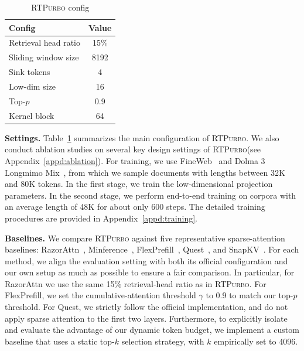 \documentclass{llmxive}
\providecommand{\name}{{\textsc{RTPurbo}}\xspace}
\providecommand{\arraystretch}{0.94}
\begin{document}
\begin{table}[t]

    \vspace{-1.0em}
    \centering
    \scriptsize
    \setlength{\tabcolsep}{3pt}
    \renewcommand{\arraystretch}{0.95}
    \captionsetup{width=\linewidth, justification=centering, singlelinecheck=true, skip=2pt}
    \begin{tabular*}{\linewidth}{@{\extracolsep{\fill}}lc@{}}
        \toprule
        \textbf{Config} & \textbf{Value} \\
        \midrule
        Retrieval head ratio & 15\% \\
        Sliding window size & 8192 \\
        Sink tokens & 4 \\
        Low-dim size & 16 \\
        Top-$p$ & 0.9 \\
        Kernel block & 64 \\
        \bottomrule
    \end{tabular*}
    \vspace{-1.0em}

\caption{\name config}
\label{tab:exp_settings}
\end{table}
\noindent\textbf{Settings.} Table~\ref{tab:exp_settings} summarizes the main configuration of \name. 
 We also conduct ablation studies on several key design settings of \name (see Appendix~\ref{appd:ablation}). For training, we use FineWeb~\citep{fineweb} and Dolma 3 Longmimo Mix~\citep{olmo2026olmo3}, from which we sample documents with lengths between 32K and 80K tokens. In the first stage, we train the low-dimensional projection parameters. In the second stage, we perform end-to-end training on corpora with an average length of 48K for about only 600 steps. The detailed training procedures are provided in Appendix~\ref{appd:training}.


\noindent\textbf{Baselines.} We compare \name against five representative sparse-attention baselines: RazorAttn~\citep{razorattn}, Minference~\citep{minference}, FlexPrefill~\citep{flexprefill}, Quest~\citep{Quest}, and SnapKV~\citep{snapkv}. For each method, we align the evaluation setting with both its official configuration and our own setup as much as possible to ensure a fair comparison. In particular, for RazorAttn we use the same 15\% retrieval-head ratio as in \name. For FlexPrefill, we set the cumulative-attention threshold $\gamma$ to 0.9 to match our top-$p$ threshold. For Quest, we strictly follow the official implementation, and do not apply sparse attention to the first two layers. Furthermore, to explicitly isolate and evaluate the advantage of our dynamic token budget, we implement a custom baseline that uses a static top-$k$ selection strategy, with $k$ empirically set to 4096.
\end{document}
